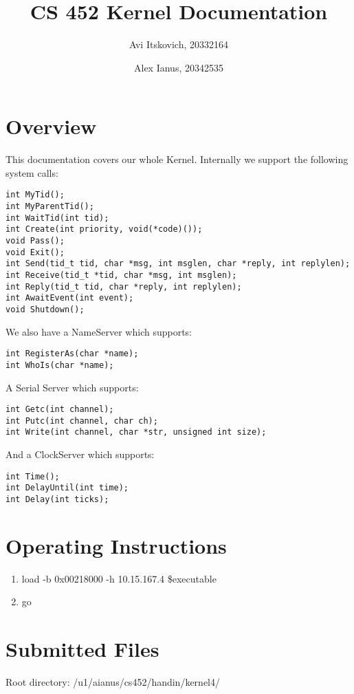 \documentclass{article}
\title{CS 452 Kernel Documentation}
\author{
  Avi Itskovich, 20332164
  \and
  Alex Ianus, 20342535
}
\begin{document}
\maketitle

\section{Overview}

This documentation covers our whole Kernel. Internally we support the following system calls:

\begin{verbatim}
int MyTid();
int MyParentTid();
int WaitTid(int tid);
int Create(int priority, void(*code)());
void Pass();
void Exit();
int Send(tid_t tid, char *msg, int msglen, char *reply, int replylen);
int Receive(tid_t *tid, char *msg, int msglen);
int Reply(tid_t tid, char *reply, int replylen);
int AwaitEvent(int event);
void Shutdown();
\end{verbatim}

We also have a NameServer which supports:

\begin{verbatim}
int RegisterAs(char *name);
int WhoIs(char *name);
\end{verbatim}

A Serial Server which supports:

\begin{verbatim}
int Getc(int channel);
int Putc(int channel, char ch);
int Write(int channel, char *str, unsigned int size);
\end{verbatim}

And a ClockServer which supports:

\begin{verbatim}
int Time();
int DelayUntil(int time);
int Delay(int ticks);
\end{verbatim}

\section{Operating Instructions}
\begin{enumerate}
  \item load -b 0x00218000 -h 10.15.167.4 \$executable
  \item go
\end{enumerate}

\section{Submitted Files}
Root directory: /u1/aianus/cs452/handin/kernel4/
\end{document}
